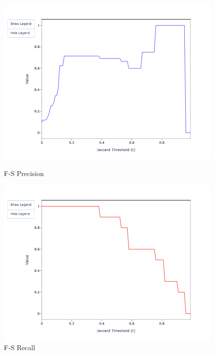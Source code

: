 \documentclass[a4paper,twoside]{article}
\begin{document}
    \begin{figure}
        \begin{minipage}{0.32\textwidth}
            \centering
            \includegraphics[width=\textwidth]{sample-usage/mini-fs-precision}
            \caption{F-S Precision}
        \end{minipage}    
        \begin{minipage}{0.32\textwidth}
            \centering
            \includegraphics[width=\textwidth]{sample-usage/mini-fs-recall}
            \caption{F-S Recall}
        \end{minipage}    
        \begin{minipage}{0.32\textwidth}
            \centering

\end{minipage}
\end{figure}
\end{document}
